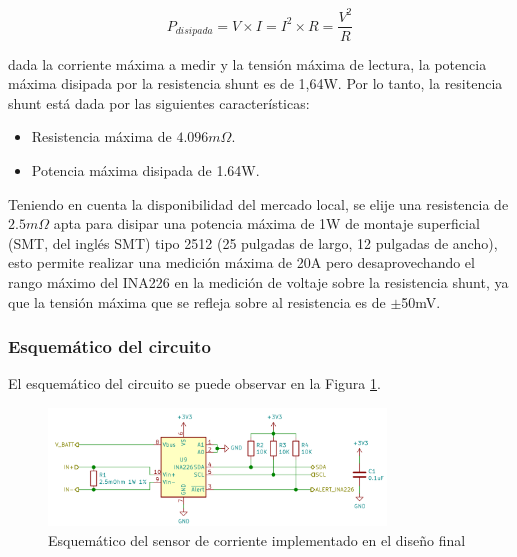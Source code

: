 \documentclass[10pt,a4paper]{article}
\begin{document}
\begin{equation}
    P_{disipada} = V \times I = I^2 \times R = \frac{V^2}{R} \label{calc_pot_res}
\end{equation}

dada la corriente m\'axima a medir y la tensi\'on m\'axima de lectura, la
potencia m\'axima disipada por la resistencia shunt es de 1,64W. Por lo tanto,
la resitencia shunt est\'a dada por las siguientes caracter\'isticas:

\begin{itemize}
    \item Resistencia m\'axima de $4.096m\Omega$.
    \item Potencia m\'axima disipada de 1.64W.
\end{itemize}

Teniendo en cuenta la disponibilidad del mercado local, se elije una resistencia 
de $2.5m\Omega$ apta para disipar una potencia m\'axima de 1W de montaje
superficial (\acrshort{SMT}, del ingl\'es \acrlong{SMT}) tipo 2512 
(25 pulgadas de largo, 12 pulgadas de ancho), esto permite realizar una
medici\'on m\'axima de 20A pero desaprovechando el rango m\'aximo del INA226 en
la medici\'on de voltaje sobre la resistencia shunt, ya que la tensi\'on
m\'axima que se refleja sobre al resistencia es de $\mathrm{\pm}$50mV.

\subsubsection{Esquem\'atico del circuito}

El esquem\'atico del circuito se puede observar en la Figura \ref{ina226_sch}.

\begin{figure}[h!]
    \begin{center}
        \includegraphics[width=0.8\textwidth]{ina226_sch.png}
        \caption{Esquem\'atico del sensor de corriente implementado en el diseño
                 final}
        \label{ina226_sch}
    \end{center}
\end{figure}
\end{document}
